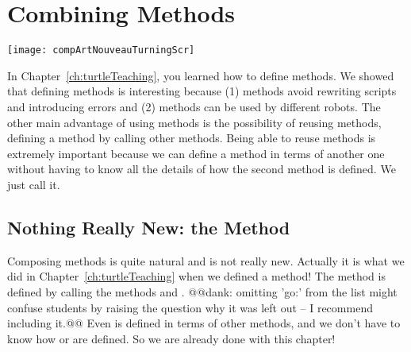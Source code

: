 \ifx\wholebook\relax\else



\fi

\chapter{\newcommand{\replace}[2]{Composing}{Combining} Methods}\label{ch:composons}

\begin{chapterfigure}
\texttt{[image: compArtNouveauTurningScr]}
\end{chapterfigure}

In  Chapter~\ref{ch:turtleTeaching}, you learned how to define methods. We showed that defining methods is interesting because (1) methods avoid \newcommand{\replace}[2]{to have to rewrite}{rewriting} scripts and \newcommand{\replace}[2]{introduce}{introducing} errors and (2) methods can be used by different robots. The other main advantage of using methods \newcommand{\remove}[1]{that we are going to explore in this chapter} is the possibility \newcommand{\replace}[2]{to reuse}{of reusing} methods, \ie \newcommand{\replace}[2]{to define}{defining} a method by calling other methods. \newcommand{\add}[1]{Reuse is what we will explore in this chapter.\paragraph
}
Being able to reuse methods is extremely important because we can define a method in terms of another one\newcommand{\add}[1]{,} without having to know all the details of how the second method is defined.  We just call it.

\section{Nothing Really New: the  Method}
Composing \newcommand{\replace}[2]{method}{methods} is quite natural and \newcommand{\remove}[1]{it} is not really new. \newcommand{\replace}[2]{Indeed, this}{Actually it} is what we \newcommand{\replace}[2]{made}{did} in Chapter~\ref{ch:turtleTeaching} when we defined a method! The method  is defined by calling the methods \turnLeft and \timesRepeat. @@dank: omitting 'go:' from the list might confuse students by raising the question why it was left out -- I recommend including it.@@  \newcommand{\replace}[2]{Therefore it}{Even } is defined in terms of other
methods\newcommand{\replace}[2]{ but}{, and} we \newcommand{\replace}[2]{do not}{don't} have to know how \turnLeft or \timesRepeat are defined. So we are already done with this chapter!

